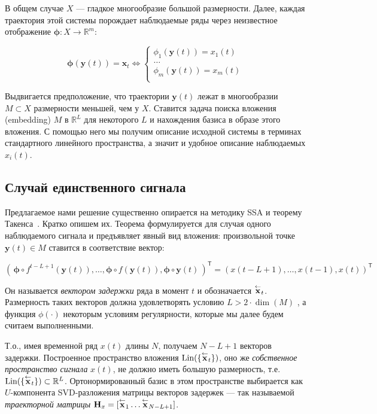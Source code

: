 		 В общем случае $ X $ --- гладкое многообразие большой размерности. Далее, каждая траектория этой системы порождает наблюдаемые ряды через неизвестное отображение $ \boldsymbol{\phi}: X \to \mathbb{R}^m $:
		 	
		 \begin{equation*}
		 	\boldsymbol{\phi}(\mathbf{y}(t)) = \mathbf{x}_t \Leftrightarrow \begin{cases}
		 		\phi_1(\mathbf{y}(t)) = x_1(t) \\
		 		\ldots \\
		 		\phi_m(\mathbf{y}(t)) = x_m(t) \\
		 	\end{cases}
		 \end{equation*}
		 	
		 Выдвигается предположение, что траектории $ \mathbf{y}(t) $ лежат в многообразии $ M \subset X $ размерности меньшей, чем у $ X $. Ставится задача поиска вложения (embedding) $ M $ в $ \mathbb{R}^{L} $ для некоторого $ L $ и нахождения базиса в образе этого вложения. С помощью него мы получим описание исходной системы в терминах стандартного линейного пространства, а значит и удобное описание наблюдаемых $ x_i(t) $.
		 
		 \subsection*{Случай единственного сигнала}
		 
		 	Предлагаемое нами решение существенно опирается на методику SSA и теорему Такенса~\cite{citeulike:2735031}. Кратко опишем их. Теорема формулируется для случая одного наблюдаемого сигнала и предъявляет явный вид вложения: произвольной точке $ \mathbf{y}(t) \in M $ ставится в соответствие вектор:
		 	
		 	 \[
		 	 	( \, \boldsymbol{\phi} \circ f^{t - L + 1}(\mathbf{y}(t)), \ldots , \boldsymbol{\phi} \circ f(\mathbf{y}(t)), \boldsymbol{\phi} \circ \mathbf{y}(t) \,)^{\mathsf{T}} = (x(t - L + 1), \ldots , x(t-1), x(t))^{\mathsf{T}}
		 	 \] 
		 	 
		 	Он называется \emph{вектором задержки} ряда в момент $ t $ и обозначается $ \overset{\leftarrow}{\mathbf{x}}_{t} $. Размерность таких векторов должна удовлетворять условию $ L > 2 \cdot \dim(M) $ , а функция $ \phi(\cdot) $ некоторым условиям регулярности, которые мы далее будем считаем выполненными.
		 	
		 	Т.о., имея временной ряд $ x(t) $ длины $ N $, получаем $ N - L + 1 $ векторов задержки. Построенное пространство вложения $ \text{Lin}(\{\overset{\leftarrow}{\mathbf{x}}_{t}\}) $, оно же \emph{собственное пространство сигнала} $ x(t) $, не должно иметь большую размерность, т.е. $ \text{Lin}(\{\overset{\leftarrow}{\mathbf{x}}_{t}\}) \subset \mathbb{R}^L $. Ортонормированный базис в этом пространстве выбирается как $ U $-компонента SVD-разложения матрицы векторов задержек --- так называемой \emph{траекторной матрицы} $ \mathbf{H}_x = [ \overset{\leftarrow}{\mathbf{x}}_{1} \ldots  \overset{\leftarrow}{\mathbf{x}}_{N - L + 1}] $.
		 	

